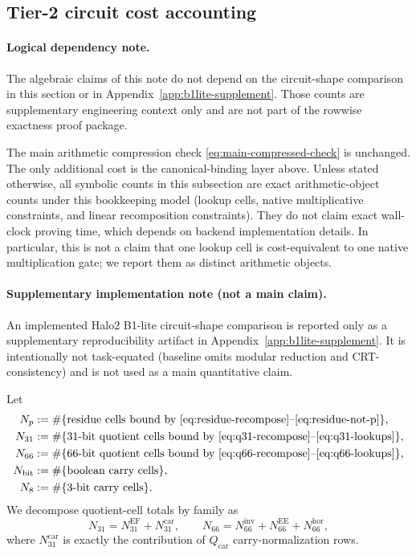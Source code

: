 ﻿\documentclass[11pt]{article}
\begin{document}
\subsection{Tier-2 circuit cost accounting}

\paragraph{Logical dependency note.}
The algebraic claims of this note do not depend on the circuit-shape comparison
in this section or in Appendix~\ref{app:b1lite-supplement}. Those counts are
supplementary engineering context only and are not part of the rowwise exactness
proof package.

The main arithmetic compression check \eqref{eq:main-compressed-check} is unchanged. The only additional cost is the canonical-binding layer above.
Unless stated otherwise, all symbolic counts in this subsection are exact arithmetic-object counts under this
bookkeeping model (lookup cells, native multiplicative constraints, and linear
recomposition constraints). They do not claim exact wall-clock proving time,
which depends on backend implementation details.
In particular, this is not a claim that one lookup cell is cost-equivalent to
one native multiplication gate; we report them as distinct arithmetic objects.
\paragraph{Supplementary implementation note (not a main claim).}
An implemented Halo2 B1-lite circuit-shape comparison is reported only as a
supplementary reproducibility artifact in
Appendix~\ref{app:b1lite-supplement}. It is intentionally not
task-equated (baseline omits modular reduction and CRT-consistency) and
is not used as a main quantitative claim.

Let
\begin{align*}
N_p &:= \#\{\text{residue cells bound by } \eqref{eq:residue-recompose}\text{--}\eqref{eq:residue-not-p}\},\\
N_{31} &:= \#\{\text{31-bit quotient cells bound by } \eqref{eq:q31-recompose}\text{--}\eqref{eq:q31-lookups}\},\\
N_{66} &:= \#\{\text{66-bit quotient cells bound by } \eqref{eq:q66-recompose}\text{--}\eqref{eq:q66-lookups}\},\\
N_{\mathrm{bit}} &:= \#\{\text{boolean carry cells}\},\\
N_8 &:= \#\{\text{3-bit carry cells}\}.
\end{align*}
We decompose quotient-cell totals by family as
\[
N_{31}=N_{31}^{\mathrm{EF}}+N_{31}^{\mathrm{car}},
\qquad
N_{66}=N_{66}^{\mathrm{inv}}+N_{66}^{\mathrm{EE}}+N_{66}^{\mathrm{hor}},
\]
where \(N_{31}^{\mathrm{car}}\) is exactly the contribution of
\(Q_{\mathrm{car}}\) carry-normalization rows.
\end{document}
